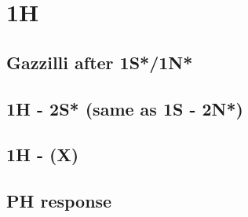 \section{1H}


\subsection{Gazzilli after 1S*/1N*}


\subsection{1H - 2S* (same as 1S - 2N*)}


\subsection{1H - (X)}


\subsection{PH response}



